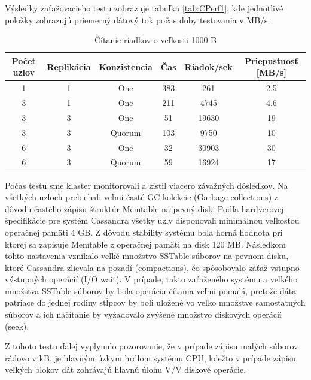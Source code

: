 \documentclass[11pt,twoside,a4paper]{book}
\begin{document}
Výsledky zaťažovacieho testu zobrazuje tabuľka \ref{tab:CPerf1}, kde jednotlivé položky zobrazujú priemerný dátový tok počas doby testovania v MB/s.
\begin{table}[hp]
\begin{center}
\begin{tabular}{|c|c|c|c|c|c|}
\hline Počet uzlov & Replikácia & Konzistencia & Čas & Riadok/sek & Priepustnosť [MB/s]\\ 
\hline
\hline 1 & 1 & One & 383 & 261 & 2.5\\ 
\hline 3 & 1 & One & 211 & 4745 & 4.6\\ 
\hline 3 & 3 & One & 51 & 19630 & 19\\ 
\hline 3 & 3 & Quorum & 103 & 9750 & 10\\ 
\hline 6 & 3 & One & 32 & 30903 & 30\\ 
\hline 6 & 3 & Quorum & 59 & 16924 & 17\\ 
\hline
\end{tabular} 
\end{center}
\caption{Čítanie riadkov o veľkosti 1000 B}
\label{tab:CPerf3}
\end{table}
Počas testu sme klaster monitorovali a zistil viacero závažných dôsledkov. Na všetkých uzloch prebiehali veľmi časté GC kolekcie (Garbage collections) z dôvodu častého zápisu štruktúr Memtable na pevný disk. Podľa hardverovej špecifikácie pre systém Cassandra všetky uzly disponovali minimálnou veľkosťou operačnej pamäti 4 GB. Z dôvodu stability systému bola horná hodnota pri ktorej sa zapisuje Memtable z operačnej pamäti na disk 120 MB. Následkom tohto nastavenia vznikalo veľké množstvo SSTable súborov na pevnom disku, ktoré Cassandra zlievala na pozadí (compactions), čo spôsobovalo záťaž vstupno výstupných operácií (I/O wait). V prípade, takto zaťaženého systému a veľkého množstva SSTable súborov by bola operácia čítania veľmi pomalá, pretože dáta patriace do jednej rodiny stĺpcov by boli uložené vo veľko množstve samostatných súborov a ich načítanie by vyžadovalo zvýšené množstvo diskových operácií (seek).

Z tohoto testu ďalej vyplynulo pozorovanie, že v prípade zápisu malých súborov rádovo v kB, je hlavným úzkym hrdlom systému CPU, kdežto v prípade zápisu veľkých blokov dát zohrávajú hlavnú úlohu V/V diskové operácie.
\end{document}
